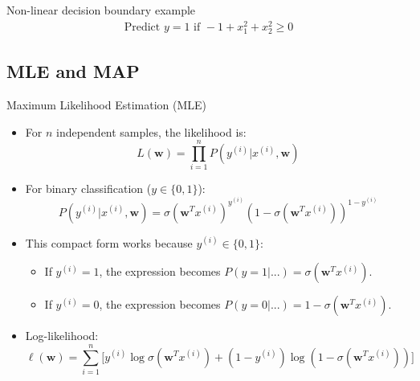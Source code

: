 \documentclass[serif, aspectratio=169]{beamer}
\begin{document}
\begin{frame}{Non-linear decision boundary example}
        \begin{align*}
            \text{Predict } y=1 \text{ if } -1 + x_1^2 + x_2^2 \geq 0
        \end{align*}

    \end{frame}
    \subsection{MLE and MAP}

    \begin{frame}{Maximum Likelihood Estimation (MLE)}
        \begin{itemize}
            \item For $n$ independent samples, the likelihood is:
            \[
                L(\mathbf{w}) = \prod_{i=1}^{n} P(y^{(i)}|x^{(i)}, \mathbf{w})
            \]
            \item For binary classification ($y \in \{0,1\}$):
            \[
                P(y^{(i)}|x^{(i)},\mathbf{w}) = \sigma (\mathbf{w}^Tx^{(i)})^{y^{(i)}} (1 - \sigma (\mathbf{w}^Tx^{(i)}))^{1 - y^{(i)}}
            \]
            \item This compact form works because $y^{(i)} \in \{0, 1\}$:
            \begin{itemize}
                \item If $y^{(i)}=1$, the expression becomes $P(y=1|...) = \sigma (\mathbf{w}^Tx^{(i)})$.
                \item If $y^{(i)}=0$, the expression becomes $P(y=0|...) = 1 - \sigma (\mathbf{w}^Tx^{(i)})$.
            \end{itemize}
            \item Log-likelihood:
            \[
                \ell(\mathbf{w}) = \sum_{i=1}^n \big[ y^{(i)} \log \sigma(\mathbf{w}^Tx^{(i)}) + (1-y^{(i)})\log (1-\sigma(\mathbf{w}^Tx^{(i)})) \big]
            \]
        \end{itemize}
    \end{frame}
\end{document}
